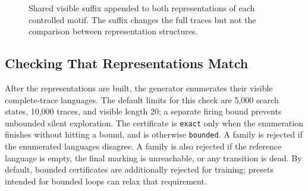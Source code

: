 \documentclass[11pt]{article}
\begin{document}
\begin{figure}[htbp]
\centering
{}
\caption{Shared visible suffix appended to both representations of each
controlled motif. The suffix changes the full traces but not the comparison
between representation structures.}
\label{fig:shared-suffix}
\end{figure}

\subsection{Checking That Representations Match}

After the representations are built, the generator enumerates their visible
complete-trace languages. The default limits for this check are 5,000 search
states, 10,000 traces, and visible length 20; a separate firing bound prevents
unbounded silent exploration. The certificate is \texttt{exact} only when the
enumeration finishes without hitting a bound, and is otherwise
\texttt{bounded}. A family is rejected if the enumerated languages disagree.
A family is also rejected if the reference language is empty, the final
marking is unreachable, or any transition is dead. By default, bounded
certificates are additionally rejected for training; presets intended for
bounded loops can relax that requirement.
\end{document}
